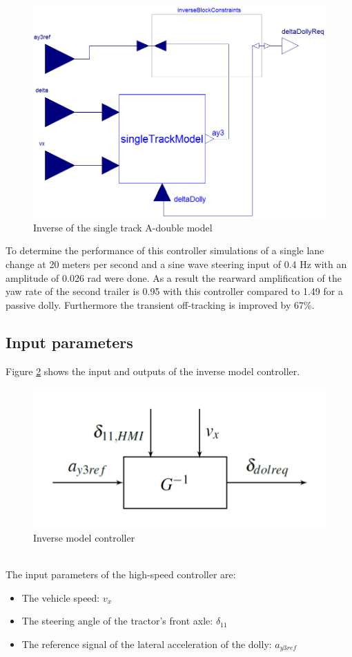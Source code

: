 \documentclass[ExampleMasters.tex]{subfiles}
\begin{document}
\begin{figure}[!htb]
	\centering
	\includegraphics[width=0.5\linewidth]{figures/Inverse_of_A-double_single-track}
	\caption[Inverse of the single track A-double model]{Inverse of the single track A-double model \cite{High-speed_paper}}
	
	\label{fig:inverse_single_track_model}
\end{figure}

To determine the performance of this controller simulations of a single lane change at 20 meters per second and a sine wave steering input of 0.4 Hz with an amplitude of 0.026 rad were done. As a result the rearward amplification of the yaw rate of the second trailer is 0.95 with this controller compared to 1.49 for a passive dolly. Furthermore the transient off-tracking is improved by 67\%. 

\subsection{Input parameters}
\label{sec:input_parameters_HS}
Figure \ref{fig:inverse_model_controller} shows the input and outputs of the inverse model controller.
\begin{figure}[!htb]
	\centering
	\includegraphics[width=0.5\linewidth]{figures/inverse_controller}
	\caption[Inverse model controller]{Inverse model controller\cite{High-speed_paper}}
	
	\label{fig:inverse_model_controller}
\end{figure}\\
The input parameters of the high-speed controller are:
\begin{itemize}
\item The vehicle speed: $v_x$ 
\item The steering angle of the tractor's front axle: $\delta_{11}$
\item The reference signal of the lateral acceleration of the dolly: $a_{y3ref}$
\end{itemize}
\end{document}
